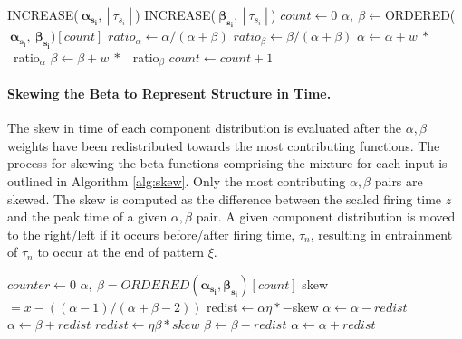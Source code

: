 \documentclass{article}
\renewcommand{\vec}[1]{\mathbf{#1}}
\begin{document}
\begin{algorithm}
\caption{Weight Addition}\label{alg:add}
\begin{algorithmic}[1]
\If{$| \ \tau_{s_i} \ | > |\vec{A_{s_i}}|$} 
\State INCREASE($\boldsymbol{ \ \alpha_{s_i}}, \ |\ \tau_{s_i}\ | \ $) 
\State \uppercase{Increase}($\boldsymbol{\ \beta_{s_i}}, \ |\ \tau_{s_i}\ | \ $)
\EndIf
\State $count \gets 0$
\State $\alpha, \ \beta \gets $ORDERED($\boldsymbol{\ \alpha_{s_i}},\boldsymbol{\ \beta_{s_i}})[count]$
\State $ratio_\alpha \gets \alpha/(\alpha + \beta)$
\State $ratio_\beta \gets \beta/(\alpha + \beta)$
\State $\alpha \gets \alpha + w\ *$ \ ratio$_\alpha$
\State $\beta \gets \beta + w\ *$ \ ratio$_\beta$
\State $count \gets count + 1$
\EndWhile
\EndFor
\EndProcedure
\end{algorithmic}
\end{algorithm}
\paragraph{Skewing the Beta to Represent Structure in Time.} The skew in time of each component distribution is evaluated after the $\alpha, \beta$ weights have been redistributed towards the most contributing functions.  The process for skewing the beta functions comprising the mixture for each input is outlined in Algorithm \ref{alg:skew}.  Only the most contributing $\alpha, \beta$ pairs are skewed.  The skew is computed as the difference between the scaled firing time $z$ and the peak time of a given $\alpha, \beta$ pair.  A given component distribution is moved to the right/left if it occurs before/after firing time, $\tau_n$, resulting in entrainment of $\tau_n$ to occur at the end of pattern $\xi$.
\begin{algorithm}
\caption{Adjusting Skew of Delay}\label{alg:skew}
\begin{algorithmic}[1]
\State $counter\gets 0$
\State $\alpha, \ \beta = ORDERED (\boldsymbol{\alpha_{s_i}},\boldsymbol{\beta_{s_i}})[count]$
\State skew$=x-((\alpha-1)/(\alpha+\beta-2))$
\State redist$\gets \alpha \eta * -$skew 
\State $\alpha \gets \alpha - redist$
\State $\alpha \gets \beta + redist$
\Else{}
\State $redist\gets \eta\beta*skew$ 
\State $\beta \gets \beta - redist$
\State $\alpha \gets \alpha + redist$
\EndIf
\EndWhile
\EndFor
\EndProcedure
\label{PC:Skew}
\end{algorithmic}
\end{algorithm}
\end{document}
